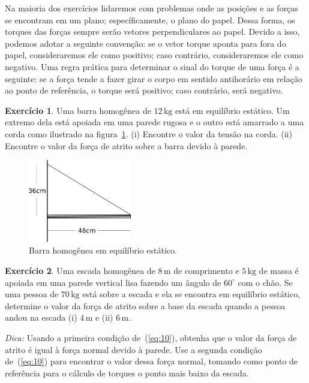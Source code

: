 \documentclass[papersize=a4,DIV=calc,twocolumn=on]{scrartcl}
\theoremstyle{definition}
\newtheorem{ex}{Exercício}[section]
\begin{document}
Na maioria dos exercícios lidaremos com problemas onde as posições e
as forças se encontram em um plano; específicamente, o plano do
papel. Dessa forma, os torques das forças sempre serão vetores
perpendiculares ao papel. Devido a isso, podemos adotar a seguinte
convenção: se o vetor torque aponta para fora do papel, consideraremos
ele como positivo; caso contrário, consideraremos ele como
negativo. Uma regra prática para determinar o sinal do torque de uma
força é a seguinte: se a força tende a fazer girar o corpo em sentido
antihorário em relação ao ponto de referência, o torque será positivo;
caso contrário, será negativo.

\begin{ex}
  Uma barra homogênea de $12\,\mathrm{kg}$ está em equilíbrio
  estático. Um extremo dela está apoiada em uma parede rugosa e o
  outro está amarrado a uma corda como ilustrado na
  figura~\ref{fig:barra_equilibrio}. (i) Encontre o valor da tensão na
  corda. (ii) Encontre o valor da força de atrito sobre a barra devido
  à parede.
  \begin{figure}[ht]
    \centering
    \includegraphics[width=0.4\textwidth,keepaspectratio]{barra_equilibrio.pdf}
    \caption{Barra homogênea em equilíbrio estático.}
    \label{fig:barra_equilibrio}
  \end{figure}
\end{ex}

\begin{ex}
  Uma escada homogênea de $8\,\mathrm{m}$ de comprimento e
  $5\,\mathrm{kg}$ de massa é apoiada em uma parede vertical lisa
  fazendo um ângulo de $60^\circ$ com o chão. Se uma pessoa de
  $70\,\mathrm{kg}$ está sobre a escada e ela se encontra em
  equilíbrio estático, determine o valor da força de atrito sobre a
  base da escada quando a pessoa andou na escada (i) $4\,\mathrm{m}$ e
  (ii) $6\,\mathrm{m}$.

  \noindent\textit{Dica:} Usando a primeira condição de~(\ref{eq:10}), obtenha
  que o valor da força de atrito é igual à força normal devido à
  parede. Use a segunda condição de~(\ref{eq:10}) para encontrar o
  valor dessa força normal, tomando como ponto de referência para o
  cálculo de torques o ponto mais baixo da escada.
\end{ex}
\end{document}
